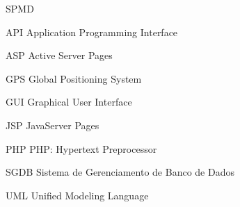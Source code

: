 \begin{listofabbrv}{SPMD}
        \item[API] Application Programming Interface 
        \item[ASP] Active Server Pages
        \item[GPS] Global Positioning System 
        \item[GUI] Graphical User Interface
        \item[JSP] JavaServer Pages 
        \item[PHP] PHP: Hypertext Preprocessor
        \item[SGDB] Sistema de Gerenciamento de Banco de Dados
        \item[UML] Unified Modeling Language
\end{listofabbrv}